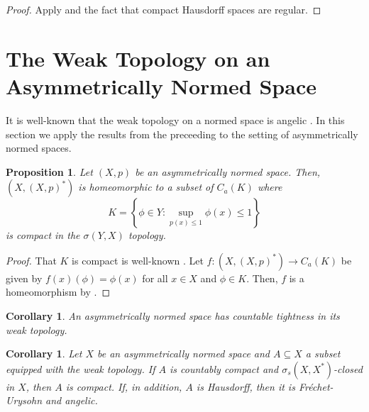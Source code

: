 \documentclass[
	paper=A4,
	pagesize=auto,
	fontsize=12pt
]{scrartcl}
\theoremstyle{plain}
\newtheorem{proposition}[theorem]{Proposition}
\newtheorem{corollary}[theorem]{Corollary}
\theoremstyle{remark}
\theoremstyle{definition}
\begin{document}
\begin{proof}
Apply  and the fact that compact Hausdorff spaces are regular.
\end{proof}
%
\section{The Weak Topology on an Asymmetrically Normed Space}
\label{sec:WeakTopologyOnAsymmetricallyNormedSpace}
%
It is well-known that the weak topology on a normed space is angelic \cite[Proposition 3.108]{src:Fabian:BanachSpaceTheory}.
In this section we apply the results from the preceeding  to the setting of asymmetrically normed spaces.
%
\begin{proposition}
Let $(X, p)$ be an asymmetrically normed space.
Then, $(X, (X, p)^*)$ is homeomorphic to a subset of $C_a(K)$ where
%
\begin{equation}
K = \left\{ \phi \in Y : \sup_{p(x) \le 1} \phi \left( x \right) \le 1 \right\}
\end{equation}
%
is compact in the $\sigma(Y, X)$ topology.
\end{proposition}
\begin{proof}
That $K$ is compact is well-known \cite[Theorem 2.4.3]{src:Cobzaş:FunctionalAnalysisinAsymmetricNormedSpaces}.
Let $f : (X, (X, p)^*) \to C_a(K)$ be given by $f(x)(\phi) = \phi(x)$ for all $x \in X$ and $\phi \in K$.
Then, $f$ is a homeomorphism by .
\end{proof}
%
\begin{corollary}
An asymmetrically normed space has countable tightness in its weak topology.
\end{corollary}
%
\begin{corollary}
Let $X$ be an asymmetrically normed space and $A \subseteq X$ a subset equipped with the weak topology.
If $A$ is countably compact and $\sigma_s(X, X^*)$-closed in $X$, then $A$ is compact.
If, in addition, $A$ is Hausdorff, then it is Fréchet-Urysohn and angelic.
\end{corollary}
%
\appendix
\printbibliography
\end{document}
